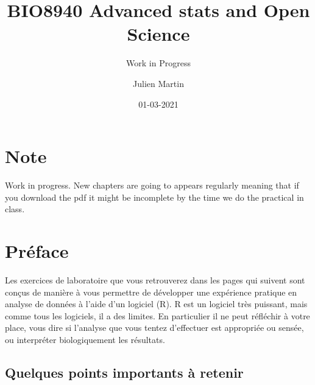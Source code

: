 \documentclass[
  12pt,
]{book}
\title{BIO8940 Advanced stats and Open Science}
\subtitle{Work in Progress}
\author{Julien Martin}
\date{01-03-2021}
\makeatletter
\newenvironment{kframe}{%
\medskip{}
\setlength{\fboxsep}{.8em}
\def\at@end@of@kframe{}%
\ifinner\ifhmode%
 \def\at@end@of@kframe{\end{minipage}}%
 \begin{minipage}{\columnwidth}%
\fi\fi%
\def\FrameCommand##1{\hskip\@totalleftmargin \hskip-\fboxsep
\colorbox{incolor}{##1}\hskip-\fboxsep
    \hskip-\linewidth \hskip-\@totalleftmargin \hskip\columnwidth}%
\MakeFramed {\advance\hsize-\width
  \@totalleftmargin\z@ \linewidth\hsize
  \@setminipage}}%
{\par\unskip\endMakeFramed%
\at@end@of@kframe}
\newenvironment{rmdblock}[1]
 {
 \begin{itemize}
 \renewcommand{\labelitemi}{
   \raisebox{-.7\height}[0pt][0pt]{
     {\setkeys{Gin}{width=3em,keepaspectratio}\texttt{[image: images/icons/\#1]}}
   }
 }
 \begin{kframe}
 \setlength{\fboxsep}{1em}
 \item
 }
 {
 \end{kframe}
 \end{itemize}
 }
\newenvironment{rmdimportant}
  {\begin{rmdblock}{important}}
  {\end{rmdblock}}
\makeatother
\begin{document}
\maketitle



{
\setcounter{tocdepth}{1}
\tableofcontents
}
\hypertarget{note}{%
\chapter*{Note}\label{note}}

\begin{rmdimportant}
Work in progress. New chapters are going to appears regularly meaning that if you download the pdf it might be incomplete by the time we do the practical in class.
\end{rmdimportant}

\hypertarget{pruxe9face}{%
\chapter*{Préface}\label{pruxe9face}}

Les exercices de laboratoire que vous retrouverez dans les pages qui suivent sont conçus de manière à vous permettre de développer une expérience pratique en analyse de données à l'aide d'un logiciel (R).
R est un logiciel très puissant, mais comme tous les logiciels, il a des limites.
En particulier il ne peut réfléchir à votre place, vous dire si l'analyse que vous tentez d'effectuer est appropriée ou sensée, ou interpréter biologiquement les résultats.

\hypertarget{quelques-points-importants-uxe0-retenir}{%
\section*{Quelques points importants à retenir}\label{quelques-points-importants-uxe0-retenir}}
\end{document}
